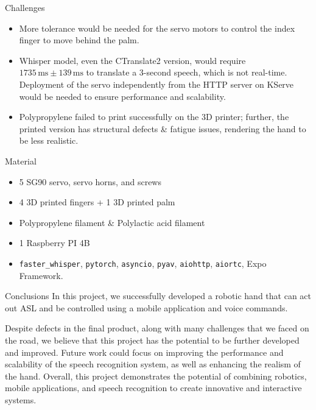 \documentclass[final, 20pt]{beamer}
\newlength{\colwidth}
\begin{document}
\begin{frame}[t]
\begin{columns}[t]
    \begin{column}{\colwidth}
      \begin{block}{Challenges}
        \begin{itemize}
          \item More tolerance would be needed for the servo motors to control the index finger to move behind the palm.
          \item Whisper model, even the CTranslate2 version, would require $1735\,\text{ms}\pm 139\,\text{ms}$ to translate a 3-second speech, which is not real-time. Deployment of the servo independently from the HTTP server on KServe would be needed to ensure performance and scalability.
          \item Polypropylene failed to print successfully on the 3D printer; further, the printed version has structural defects \& fatigue issues, rendering the hand to be less realistic.
        \end{itemize}
      \end{block}

      \begin{block}{Material}
        \begin{itemize}
          \item 5 SG90 servo, servo horns, and screws
          \item 4 3D printed fingers + 1 3D printed palm
          \item Polypropylene filament \& Polylactic acid filament
          \item 1 Raspberry PI 4B
          \item \texttt{faster\_whisper}, \texttt{pytorch}, \texttt{asyncio}, \texttt{pyav}, \texttt{aiohttp}, \texttt{aiortc}, Expo Framework.
        \end{itemize}
      \end{block}

      \begin{block}{Conclusions}
        In this project, we successfully developed a robotic hand that can act out ASL and be controlled using a mobile application and voice commands.

        Despite defects in the final product, along with many challenges that we faced on the road, we believe that this project has the potential to be further developed and improved. Future work could focus on improving the performance and scalability of the speech recognition system, as well as enhancing the realism of the hand. Overall, this project demonstrates the potential of combining robotics, mobile applications, and speech recognition to create innovative and interactive systems.
      \end{block}
    \end{column}

    \margincolumn
  \end{columns}

\end{frame}
\end{document}

